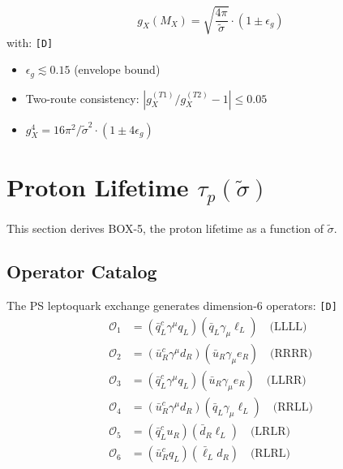 \documentclass[11pt,a4paper]{article}
\newcommand{\tagD}{\textcolor{green!50!black}{\texttt{[D]}}}
\theoremstyle{definition}
\begin{document}
\begin{derivbox}
\begin{equation}
\label{eq:box4-canonical}
\boxed{g_X(M_X) = \sqrt{\frac{4\pi}{\tilde{\sigma}}} \cdot (1 \pm \epsilon_g)}
\end{equation}
with: \tagD{}
\begin{itemize}
  \item $\epsilon_g \lesssim 0.15$ (envelope bound)
  \item Two-route consistency: $|g_X^{(T1)}/g_X^{(T2)} - 1| \leq 0.05$
  \item $g_X^4 = 16\pi^2/\tilde{\sigma}^2 \cdot (1 \pm 4\epsilon_g)$
\end{itemize}
\end{derivbox}

\section{Proton Lifetime $\tau_p(\tilde{\sigma})$}
\label{sec:taup}

This section derives BOX-5, the proton lifetime as a function of $\tilde{\sigma}$.

\subsection{Operator Catalog}
\label{subsec:operator-catalog}

The PS leptoquark exchange generates dimension-6 operators: \tagD{}
\begin{align}
\label{eq:o1-llll}
\mathcal{O}_1 &= (\bar{q}_L^c \gamma^\mu q_L)(\bar{q}_L \gamma_\mu \ell_L) \quad \text{(LLLL)} \\
\label{eq:o2-rrrr}
\mathcal{O}_2 &= (\bar{u}_R^c \gamma^\mu d_R)(\bar{u}_R \gamma_\mu e_R) \quad \text{(RRRR)} \\
\label{eq:o3-llrr}
\mathcal{O}_3 &= (\bar{q}_L^c \gamma^\mu q_L)(\bar{u}_R \gamma_\mu e_R) \quad \text{(LLRR)} \\
\label{eq:o4-rrll}
\mathcal{O}_4 &= (\bar{u}_R^c \gamma^\mu d_R)(\bar{q}_L \gamma_\mu \ell_L) \quad \text{(RRLL)} \\
\label{eq:o5-lrlr}
\mathcal{O}_5 &= (\bar{q}_L^c u_R)(\bar{d}_R \ell_L) \quad \text{(LRLR)} \\
\label{eq:o6-rlrl}
\mathcal{O}_6 &= (\bar{u}_R^c q_L)(\bar{\ell}_L d_R) \quad \text{(RLRL)}
\end{align}
\end{document}
